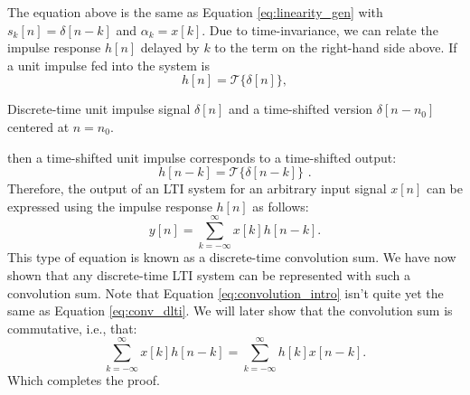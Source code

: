 \fi
\noindent The equation above is the same as Equation \ref{eq:linearity_gen} with 
$s_k[n] = \delta[n-k]$ and $\alpha_k=x[k]$.  Due to time-invariance,
we can relate the impulse response $h[n]$ delayed by $k$ to the term
on the right-hand side above. If a unit impulse fed into the system is
\begin{equation}
  h[n] = \mathcal{T}\{\delta[n]\},
\end{equation}
\begin{marginfigure}
  \begin{center}
  \end{center}
  \caption{Discrete-time unit impulse signal $\delta[n]$ and a time-shifted version $\delta[n-n_0]$ centered at $n=n_0$.}
  \label{fig:dt_unit_impulse}
\end{marginfigure}
then a time-shifted unit impulse corresponds to a time-shifted output:
\begin{equation}
  h[n-k] = \mathcal{T}\{\delta[n-k]\}\,\,.
\end{equation}
Therefore, the output of an LTI system for an arbitrary input signal
$x[n]$ can be expressed using the impulse response $h[n]$ as follows:
\begin{equation}
  y[n] = \sum_{k=-\infty}^{\infty} x[k]h[n-k].
  \label{eq:convolution_intro}
\end{equation}
This type of equation is known as a discrete-time convolution sum. We have now shown 
that any discrete-time LTI system can be represented with such a convolution sum.
Note that Equation \ref{eq:convolution_intro} isn't quite yet the same as 
Equation \ref{eq:conv_dlti}. We will later show that the convolution sum is commutative, i.e., that:
\begin{equation}
  \sum_{k=-\infty}^{\infty} x[k]h[n-k] = \sum_{k=-\infty}^{\infty} h[k]x[n-k].
\end{equation}
Which completes the proof.

